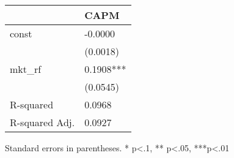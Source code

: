 \begin{table}
\caption{}
\label{}
\begin{center}
\begin{tabular}{ll}
\hline
               & CAPM       \\
\hline
const          & -0.0000    \\
               & (0.0018)   \\
mkt\_rf        & 0.1908***  \\
               & (0.0545)   \\
R-squared      & 0.0968     \\
R-squared Adj. & 0.0927     \\
\hline
\end{tabular}
\end{center}
\end{table}
\bigskip
Standard errors in parentheses. \newline 
* p<.1, ** p<.05, ***p<.01